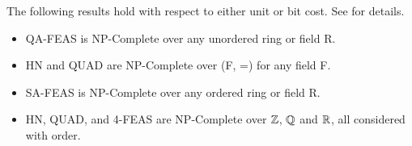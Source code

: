 The following results hold with respect to either unit or bit cost.
See \cite{B98} for details.  

\begin{itemize}
\item QA-FEAS is NP-Complete over any unordered ring or field R.
\item HN and QUAD are NP-Complete over (F, =) for any field F.
\item SA-FEAS is NP-Complete over any ordered ring or field R.
\item HN, QUAD, and 4-FEAS are NP-Complete over $\mathbb{Z}$,
  $\mathbb{Q}$ and $\mathbb{R}$, all considered with order.
\end{itemize}


